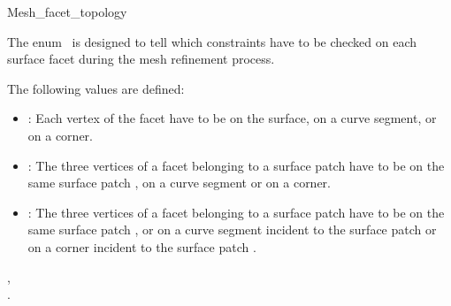 \ccRefPageBegin


\begin{ccRefEnum}{Mesh_facet_topology}  %


\ccDefinition
  
The enum \ccRefName\ is designed to tell which constraints have to
be checked on each surface facet during the mesh refinement process.





The following values are defined:
\begin{itemize}
\item {}: Each vertex of the facet have to be on the surface,
on a curve segment, or on a corner.
\item {}: The three vertices of a facet belonging to
a surface patch  have to be on the same surface patch , on a curve segment or on a corner.
\item {}: The three vertices of a
facet belonging to a surface patch  have to be on the same surface patch ,
or on a curve segment incident to the surface patch  or on a corner incident to the surface patch .
\end{itemize}

\ccSeeAlso

, \\
.



\end{ccRefEnum}

\ccRefPageEnd

